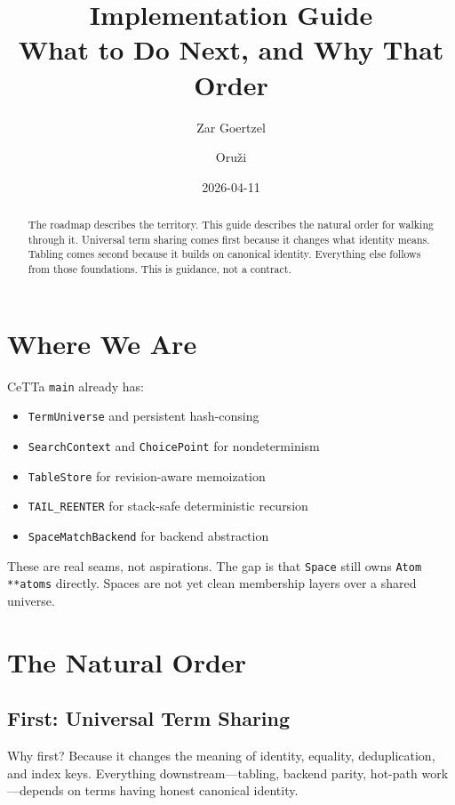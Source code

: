 \documentclass[11pt]{article}
\title{\CeTTa{} Implementation Guide\\
  \large What to Do Next, and Why That Order}
\author{Zar Goertzel \and Oru\v{z}i}
\date{2026-04-11}
\newcommand{\code}[1]{\texttt{#1}}
\newcommand{\CeTTa}{\textup{CeTTa}}
\begin{document}
\maketitle

\begin{abstract}
The roadmap describes the territory.  This guide describes the natural
order for walking through it.  Universal term sharing comes first because
it changes what identity means.  Tabling comes second because it builds
on canonical identity.  Everything else follows from those foundations.
This is guidance, not a contract.
\end{abstract}

\tableofcontents

\section{Where We Are}

\CeTTa{} \code{main} already has:

\begin{itemize}
\item \code{TermUniverse} and persistent hash-consing
\item \code{SearchContext} and \code{ChoicePoint} for nondeterminism
\item \code{TableStore} for revision-aware memoization
\item \code{TAIL\_REENTER} for stack-safe deterministic recursion
\item \code{SpaceMatchBackend} for backend abstraction
\end{itemize}

These are real seams, not aspirations.  The gap is that \code{Space}
still owns \code{Atom **atoms} directly.  Spaces are not yet clean
membership layers over a shared universe.

\section{The Natural Order}

\subsection{First: Universal Term Sharing}

Why first?  Because it changes the meaning of identity, equality,
deduplication, and index keys.  Everything downstream---tabling,
backend parity, hot-path work---depends on terms having honest
canonical identity.
\end{document}
